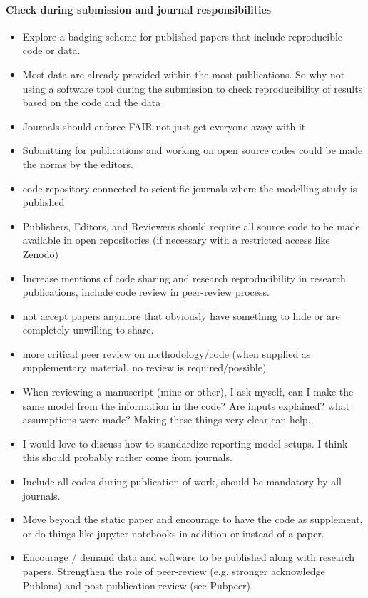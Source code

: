 \documentclass{article}
\begin{document}
\paragraph{Check during submission and journal responsibilities}
\begin{itemize}
	\item Explore a badging scheme for published papers that include reproducible code or data.
	\item Most data are already provided within the most publications. So why not using a software tool during the submission to check reproducibility of results based on the code and the data
	\item Journals should enforce FAIR not just get everyone away with it
	\item Submitting for publications and working on open source codes could be made the norms by the editors.
	\item code repository connected to scientific journals where the modelling study is published
	\item Publishers, Editors, and Reviewers should require all source code to be made available in open repositories (if necessary with a restricted access like Zenodo)
	\item Increase mentions of code sharing and research reproducibility in research publications, include code review in peer-review process.
	\item not accept papers anymore that obviously have something to hide or are completely unwilling to share.
	\item more critical peer review on methodology/code (when supplied as supplementary material, no review is required/possible) 
	\item When reviewing a manuscript (mine or other), I ask myself, can I make the same model from the information in the code? Are inputs explained? what assumptions were made? Making these things very clear can help. 
	\item I would love to discuss how to standardize reporting model setups. I think this should probably rather come from journals.
	\item Include all codes during publication of work, should be mandatory by all journals.
	\item Move beyond the static paper and encourage to have the code as supplement, or do things like jupyter notebooks in addition or instead of a paper.
	\item Encourage / demand data and software to be published along with research papers. Strengthen the role of peer-review (e.g. stronger acknowledge Publons) and post-publication review (see Pubpeer).

\end{itemize}
\end{document}
